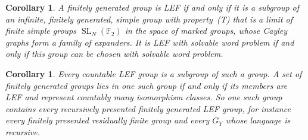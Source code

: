 \documentclass[11pt]{amsart}
\newtheorem{corollary}[theorem]{Corollary}
\newcommand{\F}{\mathbb F}
\newcommand{\SL}{\operatorname{SL}}
\begin{document}
\begin{corollary}\label{cor:lef}
A finitely generated group is LEF if and only if it is a subgroup of an
infinite, finitely generated, simple group with property~\textup{(T)}
that is a limit of finite simple groups $\SL_N(\F_2)$ in the space of
marked groups, whose Cayley graphs form a family of expanders. It is LEF
with solvable word problem if and only if this group can be chosen with
solvable word problem.
\end{corollary}

\begin{corollary}\label{cor:host}
Every countable LEF group is a subgroup of such a group. A set of
finitely generated groups lies in one such group if and only if its
members are LEF and represent countably many isomorphism classes. So one
such group contains every recursively presented finitely generated LEF
group, for instance every finitely presented residually finite group and
every $G_Y$ whose language is recursive.
\end{corollary}
\end{document}
